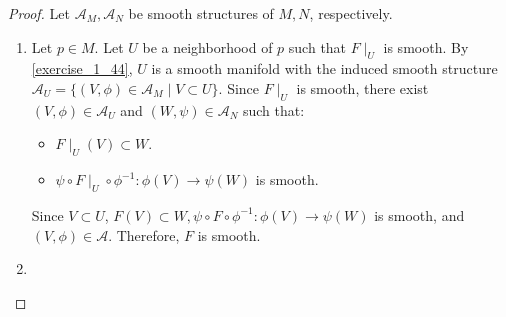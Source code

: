 \begin{proof}
  Let $\mathcal{A}_M, \mathcal{A}_N$ be smooth structures of $M, N$, respectively.
  \begin{enumerate}[label=(\alph*)]
    \item 
      Let $p \in M$.
      Let $U$ be a neighborhood of $p$ such that $F\mid_U$ is smooth.
      By \ref{exercise_1_44}, $U$ is a smooth manifold with the induced smooth structure $\mathcal{A}_U = \{ (V, \phi) \in \mathcal{A}_M \mid V \subset U \}$.
      Since $F\mid_U$ is smooth, there exist $(V, \phi) \in \mathcal{A}_U$ and $(W, \psi) \in \mathcal{A}_N$ such that:
      \begin{itemize}
        \item
          $F\mid_U(V) \subset W$.
        \item
          $\psi \circ F\mid_U \circ \phi^{-1}:\phi(V) \rightarrow \psi(W)$ is smooth.
      \end{itemize}
      Since $V \subset U$, $F(V) \subset W, \psi \circ F \circ \phi^{-1}:\phi(V) \rightarrow \psi(W)$ is smooth, and $(V, \phi) \in \mathcal{A}$.
      Therefore, $F$ is smooth.
    \item
  \end{enumerate}
\end{proof}
